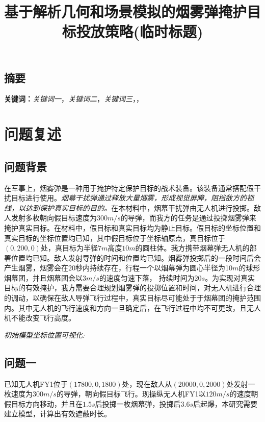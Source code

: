 \documentclass{article}
\title{\large 基于解析几何和场景模拟的烟雾弹掩护目标投放策略(临时标题)}
\date{}
\begin{document}
\maketitle
\begin{center}
\section*{摘要}
\end{center}
\vspace{-1em}


\noindent


\noindent
\textbf{关键词：}\textit{关键词一}，\textit{关键词二}，\textit{关键词三}，\textit{}，\textit{}



\section{问题复述}

\subsection{问题背景}

在军事上，烟雾弹是一种用于掩护特定保护目标的战术装备。该装备通常搭配假干扰目标进行使用。\textit{烟幕干扰弹通过释放大量烟雾，形成视觉屏障，阻挡敌方的视线，以达到保护真实目标的目的。}在本材料中，烟幕干扰弹由无人机进行投掷。敌人发射多枚朝向假目标速度为$300m/s$的导弹，而我方的任务是通过投掷烟雾弹来掩护真实目标。在材料中，假目标和真实目标均为静止目标。假目标的坐标位置和真实目标的坐标位置均已知，其中假目标位于坐标轴原点，真目标位于$(0,200,0)$处，真目标为半径$7m$高度$10m$的圆柱体。我方携带烟幕弹无人机的部署位置均已知。敌人发射导弹的时间和位置均已知。烟雾弹投掷后的一段时间后会产生烟雾，烟雾会在20秒内持续存在，行程一个以烟幕弹为圆心半径为10$m$的球形烟幕团，并且烟幕团会以$3 m/s$的速度匀速下落，
持续时间为20$s$。为实现对真实目标的有效掩护，我方需要合理规划烟雾弹的投掷位置和时间，对无人机进行合理的调动，以确保在敌人导弹飞行过程中，真实目标尽可能处于于烟幕团的掩护范围内。其中无人机的飞行速度和方向一旦确定后，在飞行过程中均不可更改，且无人机不能改变飞行高度。

\textit{初始模型坐标位置可视化:}

\subsection{问题一}

已知无人机FY1位于$(17800,0,1800)$处，现在敌人从$(20000,0,2000)$处发射一枚速度为$300m/s$的导弹，朝向假目标飞行。现操纵无人机FY1以$120m/s$的速度朝假目标方向移动，并且在$1.5s$后投掷一枚烟幕弹，投掷后$3.6s$后起爆，本研究需要建立模型，计算出有效遮蔽时长。
\end{document}
